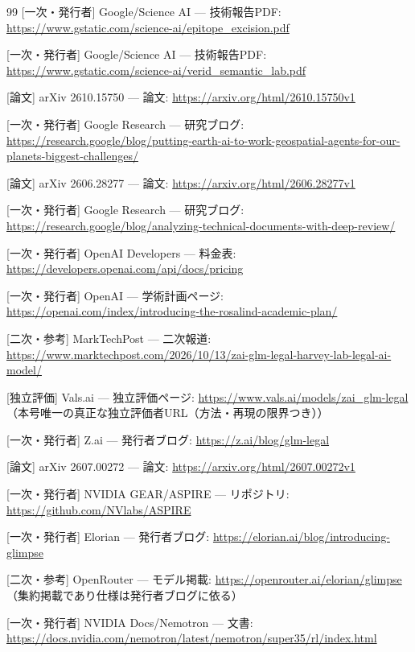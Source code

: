 \documentclass[lualatex,a4paper,10pt]{jlreq}
\begin{document}
\begin{thebibliography}{99}
 [一次・発行者] Google/Science AI — 技術報告PDF: \url{https://www.gstatic.com/science-ai/epitope_excision.pdf}

 [一次・発行者] Google/Science AI — 技術報告PDF: \url{https://www.gstatic.com/science-ai/verid_semantic_lab.pdf}

 [論文] arXiv 2610.15750 — 論文: \url{https://arxiv.org/html/2610.15750v1}

 [一次・発行者] Google Research — 研究ブログ: \url{https://research.google/blog/putting-earth-ai-to-work-geospatial-agents-for-our-planets-biggest-challenges/}

 [論文] arXiv 2606.28277 — 論文: \url{https://arxiv.org/html/2606.28277v1}

 [一次・発行者] Google Research — 研究ブログ: \url{https://research.google/blog/analyzing-technical-documents-with-deep-review/}

 [一次・発行者] OpenAI Developers — 料金表: \url{https://developers.openai.com/api/docs/pricing}

 [一次・発行者] OpenAI — 学術計画ページ: \url{https://openai.com/index/introducing-the-rosalind-academic-plan/}

 [二次・参考] MarkTechPost — 二次報道: \url{https://www.marktechpost.com/2026/10/13/zai-glm-legal-harvey-lab-legal-ai-model/}

 [独立評価] Vals.ai — 独立評価ページ: \url{https://www.vals.ai/models/zai_glm-legal}（本号唯一の真正な独立評価者URL（方法・再現の限界つき））

 [一次・発行者] Z.ai — 発行者ブログ: \url{https://z.ai/blog/glm-legal}

 [論文] arXiv 2607.00272 — 論文: \url{https://arxiv.org/html/2607.00272v1}

 [一次・発行者] NVIDIA GEAR/ASPIRE — リポジトリ: \url{https://github.com/NVlabs/ASPIRE}

 [一次・発行者] Elorian — 発行者ブログ: \url{https://elorian.ai/blog/introducing-glimpse}

 [二次・参考] OpenRouter — モデル掲載: \url{https://openrouter.ai/elorian/glimpse}（集約掲載であり仕様は発行者ブログに依る）

 [一次・発行者] NVIDIA Docs/Nemotron — 文書: \url{https://docs.nvidia.com/nemotron/latest/nemotron/super35/rl/index.html}


\end{thebibliography}
\end{document}
